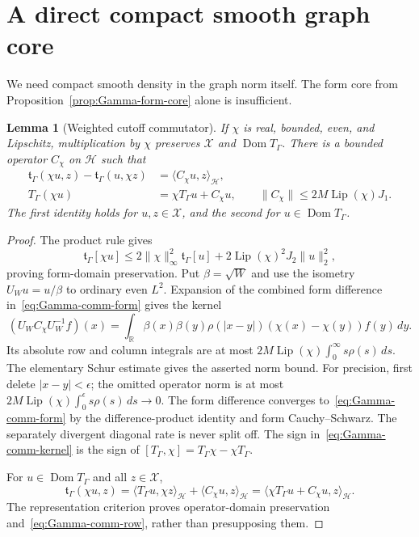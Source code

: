 \documentclass[11pt,a4paper]{article}
\numberwithin{equation}{section}
\newtheorem{lemma}[theorem]{Lemma}
\theoremstyle{definition}
\theoremstyle{remark}
\newcommand{\R}{\mathbb R}
\newcommand{\Hh}{\mathcal H}
\newcommand{\ip}[2]{\langle #1,#2\rangle}
\newcommand{\norm}[1]{\lVert #1\rVert}
\begin{document}
\section{A direct compact smooth graph core}\label{sec:Gamma-graph-core}

We need compact smooth density in the graph norm itself. The form core from Proposition~\ref{prop:Gamma-form-core} alone is insufficient.

\begin{lemma}[Weighted cutoff commutator]\label{lem:Gamma-commutator}
If $\chi$ is real, bounded, even, and Lipschitz, multiplication by $\chi$ preserves $\mathcal X$ and $\operatorname{Dom}T_\Gamma$. There is a bounded operator $C_\chi$ on $\Hh$ such that
\begin{align}
 \mathfrak t_\Gamma(\chi u,z)-\mathfrak t_\Gamma(u,\chi z)
 &=\ip{C_\chi u}{z}_{\Hh},\label{eq:Gamma-comm-form}\\
 T_\Gamma(\chi u)&=\chi T_\Gamma u+C_\chi u,
 \qquad
 \norm{C_\chi}\le2M\operatorname{Lip}(\chi)J_1.
 \label{eq:Gamma-comm-row}
\end{align}
The first identity holds for $u,z\in\mathcal X$, and the second for $u\in\operatorname{Dom}T_\Gamma$.
\end{lemma}
\begin{proof}
The product rule gives
\[
 \mathfrak t_\Gamma[\chi u]
 \le2\norm{\chi}_\infty^2\mathfrak t_\Gamma[u]
       +2\operatorname{Lip}(\chi)^2J_2\norm{u}_2^2,
\]
proving form-domain preservation. Put $\beta=\sqrt W$ and use the isometry $U_Wu=u/\beta$ to ordinary even $L^2$. Expansion of the combined form difference in~\eqref{eq:Gamma-comm-form} gives the kernel
\begin{equation}\label{eq:Gamma-comm-kernel}
 (U_W C_\chi U_W^{-1}f)(x)
 =\int_\R\beta(x)\beta(y)\rho(|x-y|)
                 (\chi(x)-\chi(y))f(y)\,dy.
\end{equation}
Its absolute row and column integrals are at most
$2M\operatorname{Lip}(\chi)\int_0^\infty s\rho(s)\,ds$.
The elementary Schur estimate gives the asserted norm bound. For precision, first delete $|x-y|<\epsilon$; the omitted operator norm is at most
$2M\operatorname{Lip}(\chi)\int_0^\epsilon s\rho(s)\,ds\to0$.
The form difference converges to~\eqref{eq:Gamma-comm-form} by the difference-product identity and form Cauchy--Schwarz. The separately divergent diagonal rate is never split off. The sign in~\eqref{eq:Gamma-comm-kernel} is the sign of $[T_\Gamma,\chi]=T_\Gamma\chi-\chi T_\Gamma$.

For $u\in\operatorname{Dom}T_\Gamma$ and all $z\in\mathcal X$,
\[
 \mathfrak t_\Gamma(\chi u,z)
 =\ip{T_\Gamma u}{\chi z}_{\Hh}+\ip{C_\chi u}{z}_{\Hh}
 =\ip{\chi T_\Gamma u+C_\chi u}{z}_{\Hh}.
\]
The representation criterion proves operator-domain preservation and~\eqref{eq:Gamma-comm-row}, rather than presupposing them.
\end{proof}
\end{document}
